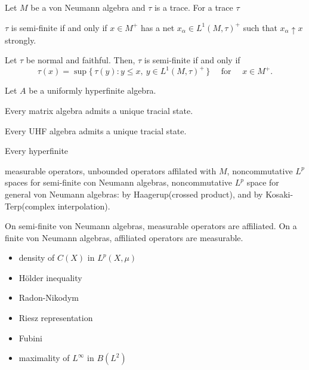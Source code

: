 \documentclass{../../large}
\begin{document}
\begin{prb}
Let $M$ be a von Neumann algebra and $\tau$ is a trace.
For a trace $\tau$
\begin{parts}
\item $\tau$ is semi-finite if and only if $x\in M^+$ has a net $x_\alpha\in L^1(M,\tau)^+$ such that $x_\alpha\uparrow x$ strongly.
\item Let $\tau$ be normal and faithful. Then, $\tau$ is semi-finite if and only if
\[\tau(x)=\sup\{\,\tau(y):y\le x,\ y\in L^1(M,\tau)^+\,\}\quad\text{ for }\quad x\in M^+.\]
\end{parts}
\end{prb}

\begin{prb}
Let $A$ be a uniformly hyperfinite algebra.
\begin{parts}
\item Every matrix algebra admits a unique tracial state.
\item Every UHF algebra admits a unique tracial state.
\item Every hyperfinite 
\end{parts}
\end{prb}


measurable operators,
unbounded operators affilated with $M$,
noncommutative $L^p$ spaces for semi-finite con Neumann algebras,
noncommutative $L^p$ space for general von Neumann algebras: by Haagerup(crossed product), and by Kosaki-Terp(complex interpolation).

On semi-finite von Neumann algebras, measurable operators are affiliated.
On a finite von Neumann algebras, affiliated operators are measurable.



\begin{prb}

\end{prb}



\begin{itemize}
\item density of $C(X)$ in $L^p(X,\mu)$
\item H\"older inequality
\item Radon-Nikodym
\item Riesz representation
\item Fubini
\item maximality of $L^\infty$ in $B(L^2)$
\end{itemize}
\end{document}
